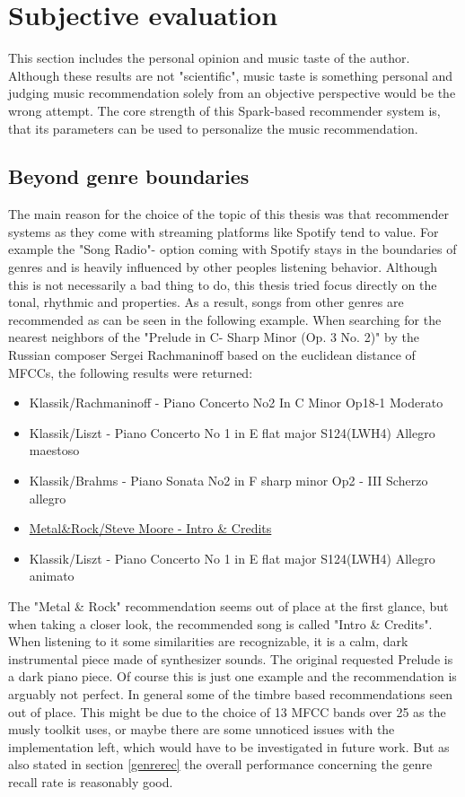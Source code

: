 \section{Subjective evaluation}

This section includes the personal opinion and music taste of the author. Although these results are not "scientific", music taste is something personal and judging music recommendation solely from an objective perspective would be the wrong attempt. The core strength of this Spark-based recommender system is, that its parameters can be used to personalize the music recommendation. 

\subsection{Beyond genre boundaries}

The main reason for the choice of the topic of this thesis was that recommender systems as they come with streaming platforms like Spotify tend to value. For example the "Song Radio"- option coming with Spotify stays in the boundaries of genres and is heavily influenced by other peoples listening behavior. Although this is not necessarily a bad thing to do, this thesis tried focus directly on the tonal, rhythmic and properties. As a result, songs from other genres are recommended as can be seen in the following example. 
\noindent When searching for the nearest neighbors of the "Prelude in C- Sharp Minor (Op. 3 No. 2)" by the Russian composer Sergei Rachmaninoff based on the euclidean distance of MFCCs, the following results were returned: 

\begin{itemize}
	\setlength\itemsep{-0.5em}
	\item Klassik/Rachmaninoff - Piano Concerto No2 In C Minor Op18-1 Moderato
	\item Klassik/Liszt - Piano Concerto No 1 in E flat major S124(LWH4) Allegro maestoso
	\item Klassik/Brahms - Piano Sonata No2 in F sharp minor Op2 - III Scherzo allegro
	\item \underline{Metal\&Rock/Steve Moore - Intro \& Credits}
	\item Klassik/Liszt - Piano Concerto No 1 in E flat major S124(LWH4) Allegro animato
\end{itemize}

\noindent The "Metal \& Rock" recommendation seems out of place at the first glance, but when taking a closer look, the recommended song is called "Intro \& Credits". When listening to it some similarities are recognizable, it is a calm, dark instrumental piece made of synthesizer sounds. The original requested Prelude is a dark piano piece. Of course this is just one example and the recommendation is arguably not perfect. In general some of the timbre based recommendations seen out of place. This might be due to the choice of 13 MFCC bands over 25 as the musly toolkit uses, or maybe there are some unnoticed issues with the implementation left, which would have to be investigated in future work. But as also stated in section \ref{genrerec} the overall performance concerning the genre recall rate is reasonably good.

